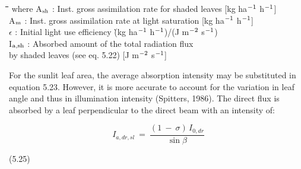 \nwln
\begin{tabbing}
\hspace{1.27cm}\=\hspace{1.27cm}\=\hspace{1.27cm}\=\hspace{1.27cm}\=%
\hspace{1.27cm}\=\hspace{1.27cm}\=\hspace{1.27cm}\=\hspace{1.27cm}\=%
\hspace{1.27cm}\=\hspace{1.27cm}\=\kill
where A$_{{\rm sh}}$ : Inst. gross assimilation rate for shaded leaves        [kg ha$^{{\rm -1}}$ h$^{{\rm -1}}$]\\
A$_{{\rm m}}$ : Inst. gross assimilation rate at light saturation        [kg ha$^{{\rm -1}}$ h$^{{\rm -1}}$]\\
$\epsilon$ : Initial light use efficiency      \`(kg ha$^{{\rm -1}}$ h$^{{\rm -1}}$)/(J m$^{{\rm -2}}$ s$^{{\rm -1}}$)\\
I$_{{\rm a,sh}}$ : Absorbed amount of the total radiation flux \\
   by shaded leaves (see eq. 5.22)        [J m$^{{\rm -2}}$ s$^{{\rm -1}}$]
\end{tabbing}









For the sunlit leaf area, the average absorption intensity may be substituted in equation
5.23. However, it is more accurate to account for the variation in leaf angle and thus in
illumination intensity (Spitters, 1986). The direct flux is absorbed by a leaf perpendicular
to the direct beam with an intensity of: 

\begin{displaymath}
I _{a,dr,sl} ~=~{\frac{(1~-~ \sigma )\, I _{0,dr} }{\sin \beta }}
\end{displaymath}

 
\strut\hfill (5.25)

